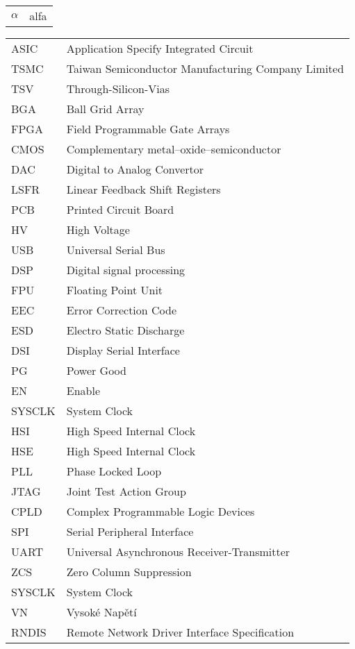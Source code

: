 \begin{tabular}{ l  l }
	
	$\alpha$ 			& alfa 				\\
	
\end{tabular}

\begin{tabular}{ l  l }
	
	ASIC & Application Specify Integrated Circuit \\
	TSMC & Taiwan Semiconductor Manufacturing Company Limited \\ 
	TSV	 & Through-Silicon-Vias \\
	BGA & Ball Grid Array \\
	FPGA & Field Programmable Gate Arrays \\
	CMOS & Complementary metal–oxide–semiconductor \\
	DAC & Digital to Analog Convertor \\
	LSFR & Linear Feedback Shift Registers \\
	PCB & Printed Circuit Board \\
	HV & High Voltage \\
	USB & Universal Serial Bus \\
	DSP & Digital signal processing \\
	FPU & Floating Point Unit \\
	EEC & Error Correction Code \\
	ESD & Electro Static Discharge \\
	DSI & Display Serial Interface \\
	PG & Power Good \\
	EN & Enable \\
	SYSCLK & System Clock \\
	HSI & High Speed Internal Clock \\
	HSE & High Speed Internal Clock \\
	PLL & Phase Locked Loop \\
	JTAG & Joint Test Action Group \\
	CPLD & Complex Programmable Logic Devices \\
	SPI & Serial Peripheral Interface \\
	UART & Universal Asynchronous Receiver-Transmitter \\
	ZCS & Zero Column Suppression \\
	SYSCLK & System Clock \\
	VN & Vysoké Napětí \\
	RNDIS & Remote Network Driver Interface Specification \\
	
	
		
\end{tabular}